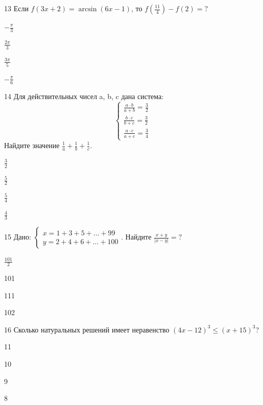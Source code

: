 \documentclass[14pt]{article}
\begin{document}
\begin{questionbox}{13}
    Если \(f(3x + 2) = \arcsin(6x - 1)\), то \(f\left(\frac{11}{4}\right) - f(2) = ?\)
    \begin{options}
        \item \(-\frac{\pi}{3}\)
        \item \(\frac{2\pi}{3}\)
        \item \(\frac{3\pi}{5}\)
        \item \(-\frac{\pi}{6}\)
    \end{options}
\end{questionbox}



\begin{questionbox}{14}
    Для действительных чисел a, b, c дана система:
    \[
    \begin{cases} \frac{a \cdot b}{a+b} = \frac{3}{2} \\ \frac{b \cdot c}{b+c} = \frac{3}{2} \\ \frac{a \cdot c}{a+c} = \frac{3}{4} \end{cases}
    \]
    Найдите значение \(\frac{1}{a} + \frac{1}{b} + \frac{1}{c}\).
    \begin{options}
        \item \(\frac{3}{2}\)
        \item \(\frac{5}{2}\)
        \item \(\frac{5}{4}\)
        \item \(\frac{4}{3}\)
    \end{options}
\end{questionbox}



\begin{questionbox}{15}
    Дано: \(\begin{cases} x = 1 + 3 + 5 + \dots + 99 \\ y = 2 + 4 + 6 + \dots + 100 \end{cases}\). Найдите \(\frac{x+y}{|x-y|} = ?\)
    \begin{options}
        \item \(\frac{101}{2}\)
        \item 101
        \item 111
        \item 102
    \end{options}
\end{questionbox}



\begin{questionbox}{16}
    Сколько натуральных решений имеет неравенство \((4x - 12)^3 \leq (x + 15)^3\)?
    \begin{options}
        \item 11
        \item 10
        \item 9
        \item 8
    \end{options}
\end{questionbox}
\end{document}
